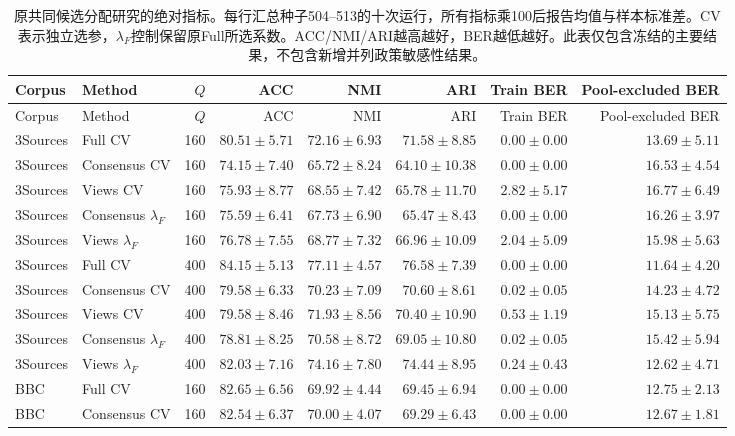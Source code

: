 \begingroup\small
\setlength{\tabcolsep}{3pt}
\begin{longtable}{llrrrrrr}
\caption{原共同候选分配研究的绝对指标。每行汇总种子504--513的十次运行，所有指标乘100后报告均值与样本标准差。CV表示独立选参，$\lambda_F$控制保留原Full所选系数。ACC/NMI/ARI越高越好，BER越低越好。此表仅包含冻结的主要结果，不包含新增并列政策敏感性结果。}\label{tab:allocation-primary-absolute}\\
\toprule
Corpus & Method & $Q$ & ACC & NMI & ARI & Train BER & Pool-excluded BER\\
\midrule\endfirsthead
\toprule
Corpus & Method & $Q$ & ACC & NMI & ARI & Train BER & Pool-excluded BER\\
\midrule\endhead
\bottomrule\endfoot
3Sources & Full CV & 160 & $80.51\pm5.71$ & $72.16\pm6.93$ & $71.58\pm8.85$ & $0.00\pm0.00$ & $13.69\pm5.11$\\
3Sources & Consensus CV & 160 & $74.15\pm7.40$ & $65.72\pm8.24$ & $64.10\pm10.38$ & $0.00\pm0.00$ & $16.53\pm4.54$\\
3Sources & Views CV & 160 & $75.93\pm8.77$ & $68.55\pm7.42$ & $65.78\pm11.70$ & $2.82\pm5.17$ & $16.77\pm6.49$\\
3Sources & Consensus $\lambda_F$ & 160 & $75.59\pm6.41$ & $67.73\pm6.90$ & $65.47\pm8.43$ & $0.00\pm0.00$ & $16.26\pm3.97$\\
3Sources & Views $\lambda_F$ & 160 & $76.78\pm7.55$ & $68.77\pm7.32$ & $66.96\pm10.09$ & $2.04\pm5.09$ & $15.98\pm5.63$\\
3Sources & Full CV & 400 & $84.15\pm5.13$ & $77.11\pm4.57$ & $76.58\pm7.39$ & $0.00\pm0.00$ & $11.64\pm4.20$\\
3Sources & Consensus CV & 400 & $79.58\pm6.33$ & $70.23\pm7.09$ & $70.60\pm8.61$ & $0.02\pm0.05$ & $14.23\pm4.72$\\
3Sources & Views CV & 400 & $79.58\pm8.46$ & $71.93\pm8.56$ & $70.40\pm10.90$ & $0.53\pm1.19$ & $15.13\pm5.75$\\
3Sources & Consensus $\lambda_F$ & 400 & $78.81\pm8.25$ & $70.58\pm8.72$ & $69.05\pm10.80$ & $0.02\pm0.05$ & $15.42\pm5.94$\\
3Sources & Views $\lambda_F$ & 400 & $82.03\pm7.16$ & $74.16\pm7.80$ & $74.44\pm8.95$ & $0.24\pm0.43$ & $12.62\pm4.71$\\
BBC & Full CV & 160 & $82.65\pm6.56$ & $69.92\pm4.44$ & $69.45\pm6.94$ & $0.00\pm0.00$ & $12.75\pm2.13$\\
BBC & Consensus CV & 160 & $82.54\pm6.37$ & $70.00\pm4.07$ & $69.29\pm6.43$ & $0.00\pm0.00$ & $12.67\pm1.81$\\

\end{longtable}
